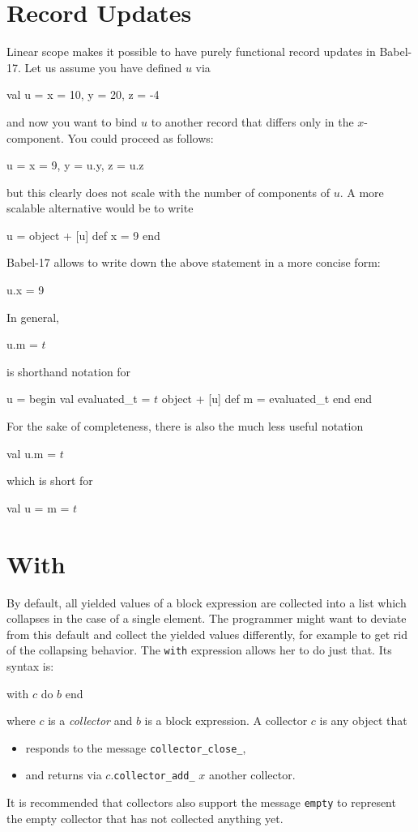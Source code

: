 \documentclass[11pt]{amsart}
\newcommand{\babelsrc}[1] {\lstinline!#1!}
\begin{document}
\section{Record Updates}
Linear scope makes it possible to have purely functional record updates in Babel-17. Let us assume you have defined $u$ via
\begin{babellisting}
val u = {x = 10, y = 20, z = -4}
\end{babellisting}
and now you want to bind $u$ to another record that differs only in the $x$-component. You could proceed as follows:
\begin{babellisting}
u = {x = 9, y = u.y, z = u.z}
\end{babellisting}
but this clearly does not scale with the number of components of $u$. A more scalable alternative would be to write
\begin{babellisting}
u = 
  object + [u]
    def x = 9
  end      
\end{babellisting}
Babel-17 allows to write down the above statement in a more concise form:
\begin{babellisting}
u.x = 9   
\end{babellisting}
In general, 
\begin{babellisting}
u.m = $t$   
\end{babellisting}
is shorthand notation for 
\begin{babellisting}
u = 
  begin
    val evaluated_t = $t$
    object + [u]
      def m = evaluated_t
    end
  end      
\end{babellisting}
For the sake of completeness, there is also the much less useful notation
\begin{babellisting}
val u.m = $t$   
\end{babellisting}
which is short for 
\begin{babellisting}
val u = { m = $t$ }  
\end{babellisting}

\section{With}\label{sec:collector}
By default, all yielded values of a block expression are collected into a list which collapses in the case of a single element. The programmer might want to deviate from this default and collect the yielded values differently, for example to get rid of the collapsing behavior. The \babelsrc{with} expression allows her to do just that. Its syntax is:
\begin{babellisting}
with $c$ do 
  $b$
end
\end{babellisting}
where $c$ is a \emph{collector} and $b$ is a block expression. A collector $c$ is any object that 
\begin{itemize}
\item responds to the message \verb+collector_close_+,
\item and returns via $c$.\verb+collector_add_+ $x$ another collector.
\end{itemize}
It is recommended that collectors also support the message \texttt{empty} to represent the empty collector that has not collected anything yet.
 
\end{document}
